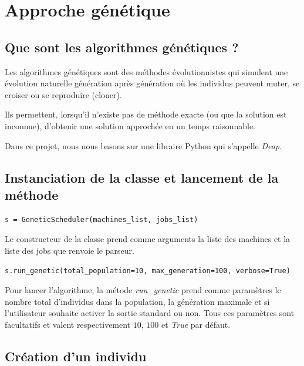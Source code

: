 \section{Approche génétique}

\subsection{Que sont les algorithmes génétiques ?}

Les algorithmes génétiques sont des méthodes évolutionnistes qui simulent une évolution naturelle génération après génération où les individus peuvent muter, se croiser ou se reproduire (cloner).

Ils permettent, lorsqu'il n'existe pas de méthode exacte (ou que la solution est inconnue), d'obtenir une solution approchée en un temps raisonnable.

Dans ce projet, nous nous basons sur une libraire Python qui s'appelle \textit{Deap}.

\subsection{Instanciation de la classe et lancement de la méthode}

\begin{lstlisting}
s = GeneticScheduler(machines_list, jobs_list)
\end{lstlisting}

Le constructeur de la classe prend comme arguments la liste des machines et la liste des jobs que renvoie le parseur.

\begin{lstlisting}
s.run_genetic(total_population=10, max_generation=100, verbose=True)
\end{lstlisting}

Pour lancer l'algorithme, la métode \textit{run\_genetic} prend comme paramètres le nombre total d'individus dans la population, la génération maximale et si l'utilisateur souhaite activer la sortie standard ou non. Tous ces paramètres sont facultatifs et valent respectivement $10$, $100$ et \textit{True} par défaut.

\subsection{Création d'un individu}




